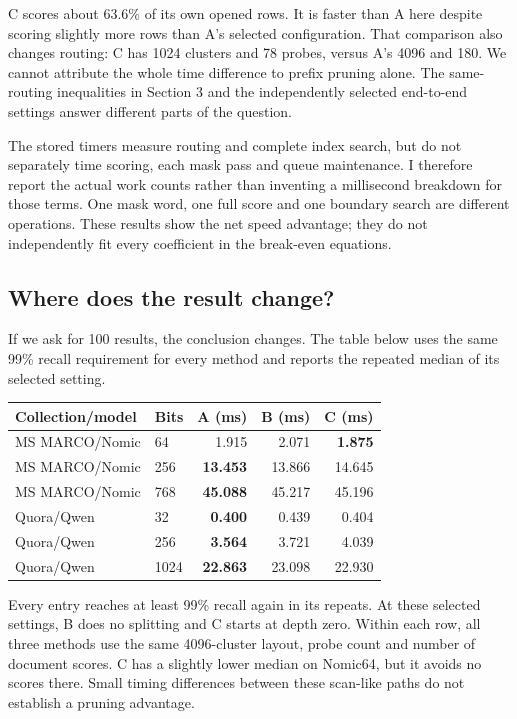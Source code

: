 C scores about 63.6\% of its own opened rows. It is faster than A here despite scoring slightly more rows than A's selected configuration. That comparison also changes routing: C has 1024 clusters and 78 probes, versus A's 4096 and 180. We cannot attribute the whole time difference to prefix pruning alone. The same-routing inequalities in Section 3 and the independently selected end-to-end settings answer different parts of the question.

The stored timers measure routing and complete index search, but do not separately time scoring, each mask pass and queue maintenance. I therefore report the actual work counts rather than inventing a millisecond breakdown for those terms. One mask word, one full score and one boundary search are different operations. These results show the net speed advantage; they do not independently fit every coefficient in the break-even equations.

\subsection{Where does the result change?}
If we ask for 100 results, the conclusion changes. The table below uses the same 99\% recall requirement for every method and reports the repeated median of its selected setting.

\begin{center}\small
\begin{tabular}{@{}llrrr@{}}\toprule
Collection/model & Bits & A (ms) & B (ms) & C (ms)\\\midrule
MS MARCO/Nomic & 64 & 1.915 & 2.071 & \textbf{1.875}\\
MS MARCO/Nomic & 256 & \textbf{13.453} & 13.866 & 14.645\\
MS MARCO/Nomic & 768 & \textbf{45.088} & 45.217 & 45.196\\
Quora/Qwen & 32 & \textbf{0.400} & 0.439 & 0.404\\
Quora/Qwen & 256 & \textbf{3.564} & 3.721 & 4.039\\
Quora/Qwen & 1024 & \textbf{22.863} & 23.098 & 22.930\\\bottomrule
\end{tabular}
\end{center}
Every entry reaches at least 99\% recall again in its repeats. At these selected settings, B does no splitting and C starts at depth zero. Within each row, all three methods use the same 4096-cluster layout, probe count and number of document scores. C has a slightly lower median on Nomic64, but it avoids no scores there. Small timing differences between these scan-like paths do not establish a pruning advantage.

